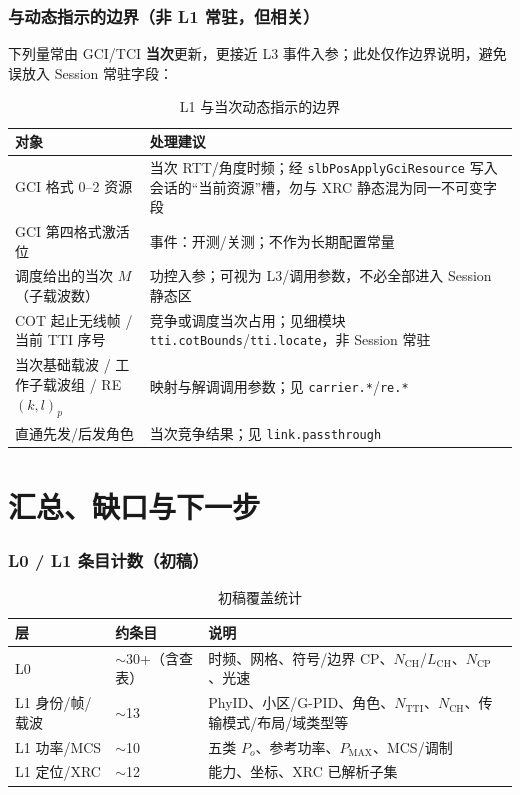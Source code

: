 \documentclass[11pt,a4paper]{ctexart}
\begin{document}
\section{与动态指示的边界（非 L1 常驻，但相关）}

下列量常由 GCI/TCI \textbf{当次}更新，更接近 L3 事件入参；此处仅作边界说明，避免误放入 Session 常驻字段：

\begin{longtable}{L{4.5cm}L{10.2cm}}
\caption{L1 与当次动态指示的边界\label{tab:l1-vs-dyn}} \\
\toprule
\textbf{对象} & \textbf{处理建议} \\
\midrule
GCI 格式 0--2 资源 & 当次 RTT/角度时频；经 \texttt{slbPosApplyGciResource} 写入会话的``当前资源''槽，勿与 XRC 静态混为同一不可变字段 \\
GCI 第四格式激活位 & 事件：开测/关测；不作为长期配置常量 \\
调度给出的当次 $M$（子载波数） & 功控入参；可视为 L3/调用参数，不必全部进入 Session 静态区 \\
COT 起止无线帧 / 当前 TTI 序号 & 竞争或调度当次占用；见细模块 \texttt{tti.cotBounds}/\texttt{tti.locate}，非 Session 常驻 \\
当次基础载波 / 工作子载波组 / RE $(k,l)_p$ & 映射与解调调用参数；见 \texttt{carrier.*}/\texttt{re.*} \\
直通先发/后发角色 & 当次竞争结果；见 \texttt{link.passthrough} \\
\bottomrule
\end{longtable}

\newpage
\part{汇总、缺口与下一步}

\section{L0 / L1 条目计数（初稿）}

\begin{longtable}{L{3cm}C{3cm}L{8.5cm}}
\caption{初稿覆盖统计\label{tab:count}} \\
\toprule
\textbf{层} & \textbf{约条目} & \textbf{说明} \\
\midrule
L0 & $\sim$30+（含查表） & 时频、网格、符号/边界 CP、$N_{\mathrm{CH}}$/$L_{\mathrm{CH}}$、$N_{\mathrm{CP}}$、光速 \\
L1 身份/帧/载波 & $\sim$13 & PhyID、小区/G-PID、角色、$N_{\mathrm{TTI}}$、$N_{\mathrm{CH}}$、传输模式/布局/域类型等 \\
L1 功率/MCS & $\sim$10 & 五类 $P_o$、参考功率、$P_{\mathrm{MAX}}$、MCS/调制 \\
L1 定位/XRC & $\sim$12 & 能力、坐标、XRC 已解析子集 \\
\bottomrule
\end{longtable}
\end{document}
